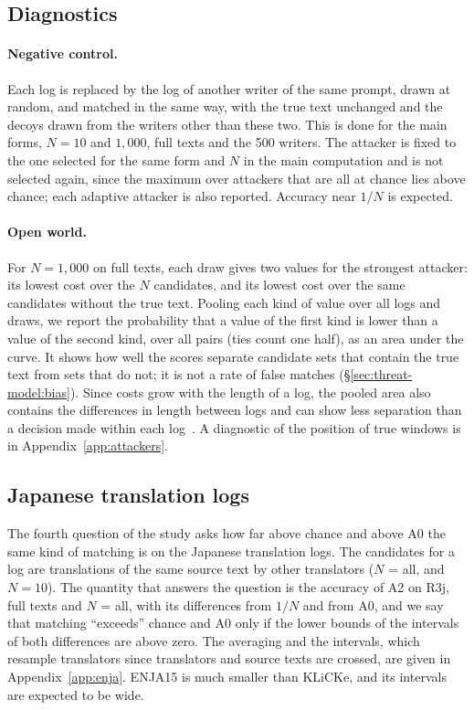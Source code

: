 \subsection{Diagnostics}
\label{sec:protocol:diagnostics}

\paragraph{Negative control.}
Each log is replaced by the log of another writer of the same prompt, drawn at random, and matched in the same way,
with the true text unchanged and the decoys drawn from the writers other than these two. This is done for the main
forms, $N = 10$ and $1{,}000$, full texts and the 500 writers. The attacker is fixed to the one selected for the same
form and $N$ in the main computation and is not selected again, since the maximum over attackers that are all at chance
lies above chance; each adaptive attacker is also reported. Accuracy near $1/N$ is expected.

\paragraph{Open world.}
For $N = 1{,}000$ on full texts, each draw gives two values for the strongest attacker: its lowest cost over the $N$
candidates, and its lowest cost over the same candidates without the true text. Pooling each kind of value over all
logs and draws, we report the probability that a value of the first kind is lower than a value of the second kind,
over all pairs (ties count one half), as an area under the curve. It shows how well the scores separate candidate sets that
contain the true text from sets that do not; it is not a rate of false matches (\S\ref{sec:threat-model:bias}). Since
costs grow with the length of a log, the pooled area also contains the differences in length between logs and can show
less separation than a decision made within each log~\cite{narayanan2008robust}. A
diagnostic of the position of true windows is in Appendix~\ref{app:attackers}.

\subsection{Japanese translation logs}
\label{sec:protocol:enja}

The fourth question of the study asks how far above chance and above A0 the same kind of matching is on the Japanese
translation logs. The candidates for a log are translations of the same source text by other translators ($N$ = all,
and $N = 10$). The quantity that answers the question is the accuracy of A2 on R3j, full texts and $N$ = all, with its
differences from $1/N$ and from A0, and we say that matching ``exceeds'' chance and A0 only if the lower bounds of the
intervals of both differences are above zero. The averaging and the intervals, which resample translators since
translators and source texts are crossed, are given in Appendix~\ref{app:enja}. ENJA15 is much smaller than KLiCKe,
and its intervals are expected to be wide.

